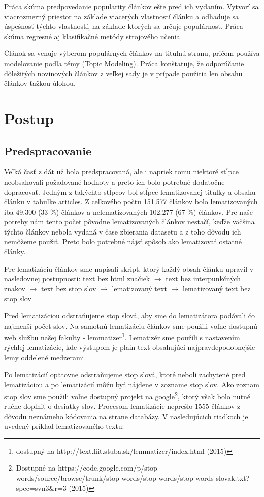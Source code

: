 \documentclass[runningheads,a4paper]{llncs}
\begin{document}
Práca skúma predpovedanie popularity článkov ešte pred ich vydaním. Vytvorí sa viacrozmerný priestor na základe viacerých vlastností článku a odhaduje sa úspešnosť týchto vlastností, na základe ktorých sa určuje populárnosť. Práca skúma regresné aj klasifikačné metódy strojového učenia.

Článok \cite{topic} sa venuje výberom populárnych článkov na titulnú stranu, pričom používa modelovanie podľa témy (Topic Modeling). Práca konštatuje, že odporúčanie dôležitých novinových článkov z veľkej sady je v prípade použitia len obsahu článkov ťažkou úlohou.

\section{Postup}
\subsection{Predspracovanie}
Veľká časť z dát už bola predspracovaná, ale i napriek tomu niektoré stĺpce neobsahovali požadované hodnoty a preto ich bolo potrebné dodatočne dopracovať. Jedným z takýchto stĺpcov bol stĺpec lematizovanej titulky a obsahu článku v tabuľke articles. Z celkového počtu 151.577 článkov bolo lematizovaných iba 49.300 (33 \%) článkov a nelematizovaných 102.277 (67 \%) článkov. Pre naše potreby nám tento počet pôvodne lematizovaných článkov nestačí, keďže väčšina týchto článkov nebola vydaná v čase zbierania datasetu a z toho dôvodu ich nemôžeme použiť. Preto bolo potrebné nájsť spôsob ako lematizovať ostatné články.
 
Pre lematizáciu článkov sme napísali skript, ktorý každý obsah článku upravil v nasledovnej postupnosti:
\newline
\newline
text bez html značiek $\rightarrow$ text bez interpunkčných znakov $\rightarrow$ text bez stop slov $\rightarrow$ lematizovaný text $\rightarrow$ lematizovaný text bez stop slov
\newline

Pred lematizáciou odstraňujeme stop slová, aby sme do lematizátora podávali čo najmenší počet slov. Na samotnú lematizáciu článkov sme použili voľne dostupnú web službu našej fakulty - lemmatizer\footnote{dostupný na http://text.fiit.stuba.sk/lemmatizer/index.html (2015)}. Lematizér sme použili s nastavením rýchlej lematizácie, kde výstupom je plain-text obsahujúci najpravdepodobnejšie lemy oddelené medzerami.

Po lematizácií opätovne odstraňujeme stop slová, ktoré neboli zachytené pred lematizáciou a po lematizácií môžu byť nájdene v zozname stop slov.
Ako zoznam stop slov sme použili voľne dostupný projekt na google\footnote{Dostupné na https://code.google.com/p/stop-words/source/browse/trunk/stop-words/stop-words/stop-words-slovak.txt?spec=svn3\&r=3 (2015)}, ktorý však bolo nutné ručne doplniť o desiatky slov. Procesom lematizácie neprešlo 1555 článkov z dôvodu neznámeho kódovania na strane databázy. V nasledujúcich riadkoch je uvedený príklad lematizovaného textu: 
\end{document}
